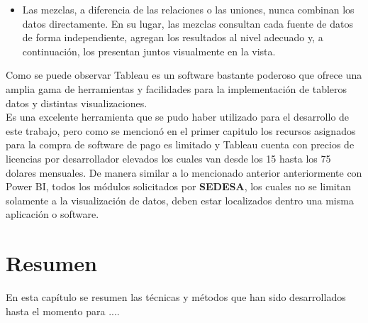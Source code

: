 \begin{itemize}
\begin{itemize}
        \item Las mezclas, a diferencia de las relaciones o las uniones, nunca combinan los datos directamente. En su lugar, las mezclas consultan cada fuente de datos de forma independiente, agregan los resultados al nivel adecuado y, a continuación, los presentan juntos visualmente en la vista. 
    \end{itemize}


    Como se puede observar Tableau es un software bastante poderoso que ofrece una amplia gama de herramientas y facilidades para la implementación de tableros datos y distintas visualizaciones.\\
    Es una excelente herramienta que se pudo haber utilizado para el desarrollo de este trabajo, pero como se mencionó en el primer capitulo los recursos asignados para la compra de software de pago es limitado y Tableau cuenta con precios de licencias por desarrollador elevados los cuales van desde los 15 hasta los 75 dolares mensuales. De manera similar a lo mencionado anterior anteriormente con Power BI, todos los módulos solicitados por \textbf{SEDESA}, los cuales no se limitan solamente a la visualización de datos, deben estar localizados dentro una misma aplicación o software.

\end{itemize}




\section{Resumen}
En esta capítulo se resumen las técnicas y métodos que han sido desarrollados hasta el momento para ....
 
 
